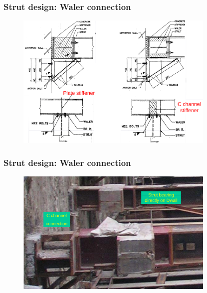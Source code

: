 \documentclass[notes]{beamer}
\begin{document}
\begin{frame}
\frametitle{Strut design: Waler connection}
\begin{figure}[ht]
	\centering
	\includegraphics[width=0.85\textwidth]{figs/plate-stiffeners-strut-waler.png}
\end{figure}
\end{frame}

\begin{frame}
\frametitle{Strut design: Waler connection}
\begin{figure}[ht]
	\centering
	\includegraphics[width=0.85\textwidth]{figs/c-channel-strut-dwall.png}
\end{figure}
\end{frame}
\end{document}
